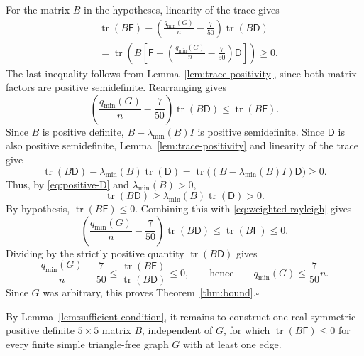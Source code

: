 \documentclass[11pt]{article}
\newcommand{\tr}{\operatorname{tr}}
\newcommand{\qmin}{q_{\min}}
\begin{document}
For the matrix $B$ in the hypotheses, linearity of the trace gives
\begin{align*}
&\tr(B\mathsf F)-
\left(\frac{\qmin(G)}n-\frac7{50}\right)\tr(B\mathsf D)\\
&=\tr\left(B\left[\mathsf F-
\left(\frac{\qmin(G)}n-\frac7{50}\right)\mathsf D\right]\right)\geq0.
\end{align*}
The last inequality follows from Lemma~\ref{lem:trace-positivity},
since both matrix factors are positive semidefinite.
Rearranging gives
\begin{equation}\label{eq:weighted-rayleigh}
\left(\frac{\qmin(G)}n-\frac7{50}\right)\tr(B\mathsf D)
\leq\tr(B\mathsf F).
\end{equation}
Since $B$ is positive definite, $B-\lambda_{\min}(B)I$ is positive semidefinite.
Since $\mathsf D$ is also positive semidefinite, Lemma~\ref{lem:trace-positivity} and linearity of the trace give
\[
\tr(B\mathsf D)-\lambda_{\min}(B)\tr(\mathsf D)
=\tr\bigl((B-\lambda_{\min}(B)I)\mathsf D\bigr)\geq0.
\]
Thus, by \eqref{eq:positive-D} and $\lambda_{\min}(B)>0$,
\[
\tr(B\mathsf D)\geq\lambda_{\min}(B)\tr(\mathsf D)>0.
\]
By hypothesis, $\tr(B\mathsf F)\leq0$.
Combining this with \eqref{eq:weighted-rayleigh} gives
\[
\left(\frac{\qmin(G)}n-\frac7{50}\right)\tr(B\mathsf D)
\leq\tr(B\mathsf F)\leq0.
\]
Dividing by the strictly positive quantity $\tr(B\mathsf D)$ gives
\[
\frac{\qmin(G)}n-\frac7{50}
\leq\frac{\tr(B\mathsf F)}{\tr(B\mathsf D)}\leq0,
\qquad\text{hence}\qquad
\qmin(G)\leq\frac7{50}n.
\]
Since $G$ was arbitrary, this proves Theorem~\ref{thm:bound}.\hfill$\square$

By Lemma~\ref{lem:sufficient-condition}, it remains to construct one real
symmetric positive definite $5\times5$ matrix $B$, independent of $G$,
for which $\tr(B\mathsf F)\leq0$ for every finite simple triangle-free graph
$G$ with at least one edge.
\end{document}
